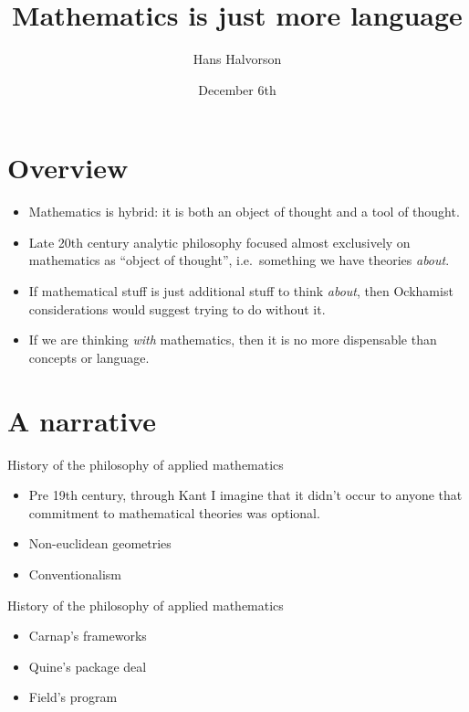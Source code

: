 \documentclass{beamer}
\title{Mathematics is just more language}
\author{Hans Halvorson}
\date{December 6th}
\begin{document}
\begin{frame}
    \titlepage
\end{frame}

\section{Overview} 

\begin{frame}

  \begin{itemize}
  \item Mathematics is hybrid: it is both an object of thought and a
    tool of thought.
  \item Late 20th century analytic philosophy focused almost
    exclusively on mathematics as ``object of thought'', i.e.\
    something we have theories \emph{about}.
  \item If mathematical stuff is just additional stuff to think
    \emph{about}, then Ockhamist considerations would suggest trying
    to do without it.
  \item If we are thinking \emph{with} mathematics, then it is no more
    dispensable than concepts or language. \end{itemize}


  \end{frame}

\section{A narrative}

\begin{frame}{History of the philosophy of applied mathematics}

  \begin{itemize}
  \item Pre 19th century, through Kant \newline I imagine that it
    didn't occur to anyone that commitment to mathematical theories
    was optional.
  \item Non-euclidean geometries
  \item Conventionalism
  \end{itemize}

\end{frame}

\begin{frame}{History of the philosophy of applied mathematics}

  \begin{itemize}
  \item Carnap's frameworks
  \item Quine's package deal
  \item Field's program 
  \end{itemize}

\end{frame}
\end{document}
